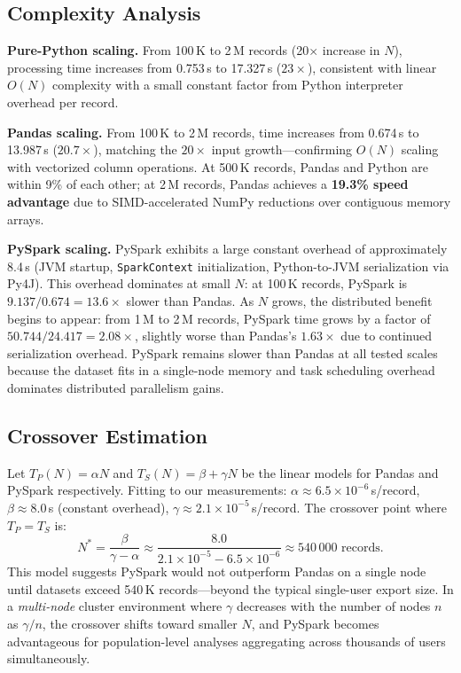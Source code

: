 \documentclass[conference]{IEEEtran}
\begin{document}
\subsection{Complexity Analysis}

\textbf{Pure-Python scaling.}
From 100\,K to 2\,M records (20$\times$ increase in $N$), processing time
increases from 0.753\,s to 17.327\,s ($23\times$), consistent with linear
$O(N)$ complexity with a small constant factor from Python interpreter
overhead per record.

\textbf{Pandas scaling.}
From 100\,K to 2\,M records, time increases from 0.674\,s to 13.987\,s
($20.7\times$), matching the $20\times$ input growth—confirming $O(N)$
scaling with vectorized column operations. At 500\,K records, Pandas
and Python are within 9\% of each other; at 2\,M records, Pandas achieves
a \textbf{19.3\% speed advantage} due to SIMD-accelerated NumPy reductions
over contiguous memory arrays.

\textbf{PySpark scaling.}
PySpark exhibits a large constant overhead of approximately 8.4\,s
(JVM startup, \texttt{SparkContext} initialization, Python-to-JVM
serialization via Py4J). This overhead dominates at small $N$: at 100\,K
records, PySpark is $9.137 / 0.674 = \mathbf{13.6\times}$ slower than Pandas.
As $N$ grows, the distributed benefit begins to appear: from 1\,M to
2\,M records, PySpark time grows by a factor of $50.744 / 24.417 = 2.08\times$,
slightly worse than Pandas's $1.63\times$ due to continued serialization
overhead. PySpark remains slower than Pandas at all tested scales because
the dataset fits in a single-node memory and task scheduling overhead
dominates distributed parallelism gains.

\subsection{Crossover Estimation}

Let $T_P(N) = \alpha N$ and $T_S(N) = \beta + \gamma N$ be the linear
models for Pandas and PySpark respectively. Fitting to our measurements:
$\alpha \approx 6.5 \times 10^{-6}$\,s/record,
$\beta \approx 8.0$\,s (constant overhead),
$\gamma \approx 2.1 \times 10^{-5}$\,s/record.
The crossover point where $T_P = T_S$ is:
\begin{equation}
  N^* = \frac{\beta}{\gamma - \alpha} \approx \frac{8.0}{2.1\times10^{-5} - 6.5\times10^{-6}} \approx 540\,000 \text{ records}.
\end{equation}
This model suggests PySpark would not outperform Pandas on a single node
until datasets exceed 540\,K records—beyond the typical single-user export
size. In a \emph{multi-node} cluster environment where $\gamma$ decreases
with the number of nodes $n$ as $\gamma/n$, the crossover shifts toward
smaller $N$, and PySpark becomes advantageous for population-level analyses
aggregating across thousands of users simultaneously.
\end{document}
